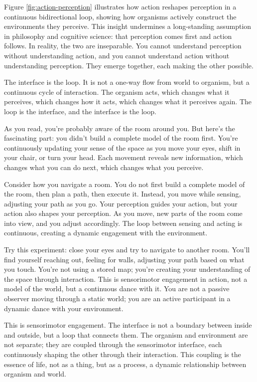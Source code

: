 \documentclass[
  openright]{book}
\begin{document}
Figure \ref{fig:action-perception} illustrates how action reshapes
perception in a continuous bidirectional loop, showing how organisms
actively construct the environments they perceive. This insight
undermines a long-standing assumption in philosophy and cognitive
science: that perception comes first and action follows. In reality, the
two are inseparable. You cannot understand perception without
understanding action, and you cannot understand action without
understanding perception. They emerge together, each making the other
possible.

The interface is the loop. It is not a one-way flow from world to
organism, but a continuous cycle of interaction. The organism acts,
which changes what it perceives, which changes how it acts, which
changes what it perceives again. The loop is the interface, and the
interface is the loop.

As you read, you're probably aware of the room around you. But here's
the fascinating part: you didn't build a complete model of the room
first. You're continuously updating your sense of the space as you move
your eyes, shift in your chair, or turn your head. Each movement reveals
new information, which changes what you can do next, which changes what
you perceive.

Consider how you navigate a room. You do not first build a complete
model of the room, then plan a path, then execute it. Instead, you move
while sensing, adjusting your path as you go. Your perception guides
your action, but your action also shapes your perception. As you move,
new parts of the room come into view, and you adjust accordingly. The
loop between sensing and acting is continuous, creating a dynamic
engagement with the environment.

Try this experiment: close your eyes and try to navigate to another
room. You'll find yourself reaching out, feeling for walls, adjusting
your path based on what you touch. You're not using a stored map; you're
creating your understanding of the space through interaction. This is
sensorimotor engagement in action, not a model of the world, but a
continuous dance with it. You are not a passive observer moving through
a static world; you are an active participant in a dynamic dance with
your environment.

This is sensorimotor engagement. The interface is not a boundary between
inside and outside, but a loop that connects them. The organism and
environment are not separate; they are coupled through the sensorimotor
interface, each continuously shaping the other through their
interaction. This coupling is the essence of life, not as a thing, but
as a process, a dynamic relationship between organism and world.
\end{document}
